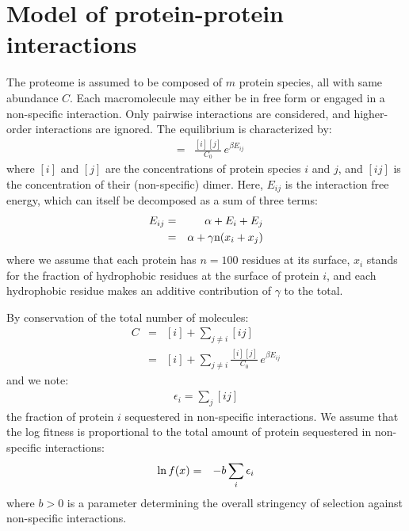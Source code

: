 \documentclass{article}
\begin{document}
\section{Model of protein-protein interactions}
The proteome is assumed to be composed of $m$ protein species, all with same abundance $C$. Each macromolecule may either be in free form or engaged in a non-specific interaction. Only pairwise interactions are considered, and higher-order interactions are ignored.
The equilibrium is characterized by:
\begin{eqnarray}
[ij] &=& \frac{[i][j]}{C_0} \, e^{\beta E_{ij}}
\end{eqnarray}
where $[i]$ and $[j]$ are the concentrations of protein species $i$ and $j$, and $[ij]$ is the concentration of their (non-specific) dimer. Here, $E_{ij}$ is the interaction free energy, which can itself be decomposed as a sum of three terms:
\begin{eqnarray}
E_{ij} &=& \alpha + E_i + E_j 
\\
&=& \alpha + \gamma \text{n} (x_i + x_j)
\end{eqnarray}
where we assume that each protein has $n=100$ residues at its surface, $x_i$ stands for the fraction of hydrophobic residues at the surface of protein $i$, and each hydrophobic residue makes an additive contribution of $\gamma$ to the total.

By conservation of the total number of molecules:
\begin{eqnarray}
C &=& [i] + \sum_{j \neq i} [ij] \\
&=& [i] + \sum_{j \neq i} \frac{[i][j]}{C_0} \, e^{\beta E_{ij}}
\end{eqnarray}
and we note:
\begin{eqnarray}
\epsilon_i = \sum_j [ij]
\end{eqnarray}
the fraction of protein $i$ sequestered in non-specific interactions.
We assume that the log fitness is proportional to the total amount of protein sequestered in non-specific interactions:
\begin{eqnarray}
\ln f(x) &=& -b \sum_i \epsilon_i
\end{eqnarray}
where $b>0$ is a parameter determining the overall stringency of selection against non-specific interactions.
\end{document}
